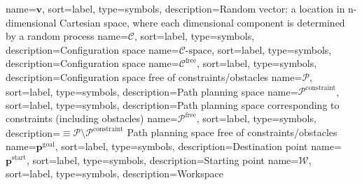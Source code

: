 %
{
name={$\mathbf{v}$},
sort={label},
type=symbols,
description={Random vector: a location in n-dimensional Cartesian space, where each dimensional component is determined by a random process}
}
%
%
%
{
name={\ensuremath{\mathcal{C}}},
sort={label},
type=symbols,
description={Configuration space}
}
%
{
name={\ensuremath{\mathcal{C}\text{-space}}},
sort={label},
type=symbols,
description={Configuration space}
}
%
{
name={\ensuremath{\mathcal{C}^{\text{free}}}},
sort={label},
type=symbols,
description={Configuration space free of constraints/obstacles}
}
%
{
name={\ensuremath{\mathcal{P}}},
sort={label},
type=symbols,
description={Path planning space}
}
%
{
name={\ensuremath{\mathcal{P}^{\text{constraint}}}},
sort={label},
type=symbols,
description={Path planning space corresponding to constraints (including obstacles)}
}
%
{
name={\ensuremath{\mathcal{P}^{\text{free}}}},
sort={label},
type=symbols,
description={$\equiv \mathcal{P} \setminus \mathcal{P}^{\text{constraint}}$ Path planning space free of constraints/obstacles}
}
%
{
name={\ensuremath{\textbf{p}^{\text{goal}}}},
sort={label},
type=symbols,
description={Destination point}
}
%
{
name={\ensuremath{\textbf{p}^{\text{start}}}},
sort={label},
type=symbols,
description={Starting point}
}
%
{
name={\ensuremath{\mathcal{W}}},
sort={label},
type=symbols,
description={Workspace}
}





